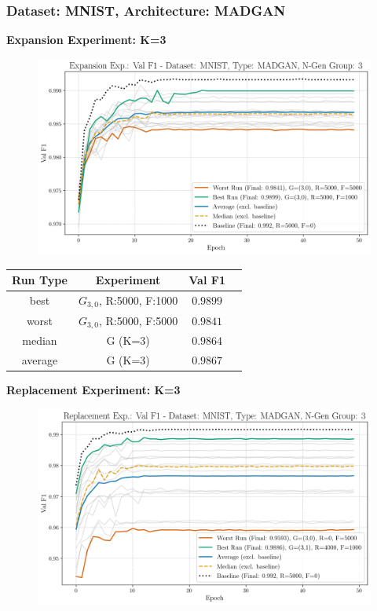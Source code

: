 \subsubsection{Dataset: MNIST, Architecture: MADGAN}\label{app_strat_class_performance_madgan_mnist}
\noindent\textbf{Expansion Experiment: K=3}
\begin{figure}[htbp]
	\centering
	\includegraphics[width=.85\textwidth]{abb/strat_classifier_performance/MNIST_STRATIFIED_CLASSIFIERS_MADGAN_NEW/expansion_experiments/val_f1_score_MADGAN_MNIST_n_gen_3_all.png}
	\label{fig:app_strat_class_performance_expansion_exp._val_f1_score_3}
\end{figure}
\begin{table}[H]
	\vspace{-1.5em}
	\centering
	\begin{tabular}{|c|c|c|c|}
		\hline
		Run Type & Experiment & Val F1 \\ \hline
		best & \(G_{3, 0}\), R:5000, F:1000 & $0.9899$\\ \hline
		worst & \(G_{3, 0}\), R:5000, F:5000 & $0.9841$\\ \hline
		median & G (K=3) & $0.9864$\\ \hline
		average & G (K=3) & $0.9867$
		\\ \hline
	\end{tabular}
\end{table}
\noindent\textbf{Replacement Experiment: K=3}
\begin{figure}[htbp]
	\centering
	\includegraphics[width=.85\textwidth]{abb/strat_classifier_performance/MNIST_STRATIFIED_CLASSIFIERS_MADGAN_NEW/replacement_experiments/val_f1_score_MADGAN_MNIST_n_gen_3_all.png}
	\label{fig:app_strat_class_performance_replacement_exp._val_f1_score_3}
\end{figure}
